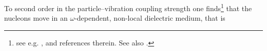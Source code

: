 %
%
 To second order in the particle--vibration coupling strength one finds\footnote{see e.g. \cite{Brink:05}, \cite{Mahaux:85} and references therein. See also \cite{Bernard:81}.} that the nucleons move in an $\omega$-dependent, non-local dielectric medium, that is 

